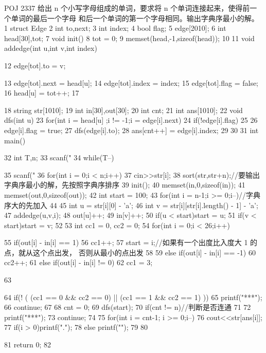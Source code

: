\documentclass[11pt]{article}
\begin{document}
\begin{Code}
     POJ 2337
     给出 n 个小写字母组成的单词，要求将 n 个单词连接起来，使得前一个单词的最后一个字母
     和后一个单词的第一个字母相同。输出字典序最小的解。
 1   struct Edge{
 2       int to,next;
 3       int index;
 4       bool flag;
 5   }edge[2010];
 6   int head[30],tot;
 7   void init(){
 8       tot = 0;
 9       memset(head,-1,sizeof(head));
10   }
11   void addedge(int u,int v,int index){
12       edge[tot].to = v;


13       edge[tot].next = head[u];
14       edge[tot].index = index;
15       edge[tot].flag = false;
16       head[u] = tot++;
17   }
18   string str[1010];
19   int in[30],out[30];
20   int cnt;
21   int ans[1010];
22   void dfs(int u){
23       for(int i = head[u] ;i != -1;i = edge[i].next)
24           if(!edge[i].flag)
25           {
26                edge[i].flag = true;
27                dfs(edge[i].to);
28                ans[cnt++] = edge[i].index;
29           }
30   }
31   int main(){
32       int T,n;
33       scanf("%
34       while(T--){
35           scanf("%
36           for(int i = 0;i < n;i++)
37                cin>>str[i];
38           sort(str,str+n);//要输出字典序最小的解，先按照字典序排序
39           init();
40           memset(in,0,sizeof(in));
41           memset(out,0,sizeof(out));
42           int start = 100;
43           for(int i = n-1;i >= 0;i--)//字典序大的先加入
44           {
45                int u = str[i][0] - 'a';
46                int v = str[i][str[i].length() - 1] - 'a';
47                addedge(u,v,i);
48                out[u]++;
49                in[v]++;
50                if(u < start)start = u;
51                if(v < start)start = v;
52           }
53           int cc1 = 0, cc2 = 0;
54           for(int i = 0;i < 26;i++){
55                if(out[i] - in[i] == 1){
56                    cc1++;
57                    start = i;//如果有一个出度比入度大 1 的点，就从这个点出发，
                         否则从最小的点出发
58                }
59                else if(out[i] - in[i] == -1)
60                    cc2++;
61                else if(out[i] - in[i] != 0)
62                    cc1 = 3;


63              }
64              if(! ( (cc1 == 0 && cc2 == 0) || (cc1 == 1 && cc2 == 1) )){
65                  printf("***\n");
66                  continue;
67              }
68              cnt = 0;
69              dfs(start);
70              if(cnt != n)//判断是否连通
71              {
72                  printf("***\n");
73                  continue;
74              }
75              for(int i = cnt-1; i >= 0;i--){
76                  cout<<str[ans[i]];
77                  if(i > 0)printf(".");
78                  else printf("\n");
79              }
80       }
81       return 0;
82 }
\end{Code}
\end{document}
